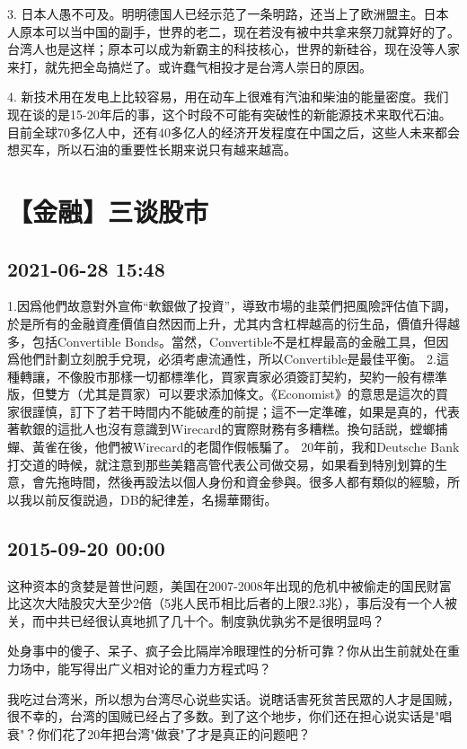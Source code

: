 \documentclass[twocolumn]{ctexart}
\begin{document}
3. 日本人愚不可及。明明德国人已经示范了一条明路，还当上了欧洲盟主。日本人原本可以当中国的副手，世界的老二，现在若没有被中共拿来祭刀就算好的了。台湾人也是这样；原本可以成为新霸主的科技核心，世界的新硅谷，现在没等人家来打，就先把全岛搞烂了。或许蠢气相投才是台湾人崇日的原因。

4. 新技术用在发电上比较容易，用在动车上很难有汽油和柴油的能量密度。我们现在谈的是15-20年后的事，这个时段不可能有突破性的新能源技术来取代石油。目前全球70多亿人中，还有40多亿人的经济开发程度在中国之后，这些人未来都会想买车，所以石油的重要性长期来说只有越来越高。\section*{【金融】三谈股市}
\subsection*{2021-06-28 15:48}

1.因爲他們故意對外宣佈“軟銀做了投資”，導致市場的韭菜們把風險評估值下調，於是所有的金融資產價值自然因而上升，尤其内含杠桿越高的衍生品，價值升得越多，包括Convertible Bonds。當然，Convertible不是杠桿最高的金融工具，但因爲他們計劃立刻脫手兌現，必須考慮流通性，所以Convertible是最佳平衡。
2.這種轉讓，不像股市那樣一切都標準化，買家賣家必須簽訂契約，契約一般有標準版，但雙方（尤其是買家）可以要求添加條文。《Economist》的意思是這次的買家很謹慎，訂下了若干時間内不能破產的前提；這不一定準確，如果是真的，代表著軟銀的這批人也沒有意識到Wirecard的實際財務有多糟糕。換句話説，螳螂捕蟬、黃雀在後，他們被Wirecard的老闆作假帳騙了。
20年前，我和Deutsche Bank打交道的時候，就注意到那些美籍高管代表公司做交易，如果看到特別划算的生意，會先拖時間，然後再設法以個人身份和資金參與。很多人都有類似的經驗，所以我以前反復説過，DB的紀律差，名揚華爾街。
\subsection*{2015-09-20 00:00}
这种资本的贪婪是普世问题，美国在2007-2008年出现的危机中被偷走的国民财富比这次大陆股灾大至少2倍（5兆人民币相比后者的上限2.3兆），事后没有一个人被关，而中共已经很认真地抓了几十个。制度孰优孰劣不是很明显吗？

处身事中的傻子、呆子、疯子会比隔岸冷眼理性的分析可靠？你从出生前就处在重力场中，能写得出广义相对论的重力方程式吗？

我吃过台湾米，所以想为台湾尽心说些实话。说瞎话害死贫苦民眾的人才是国贼，很不幸的，台湾的国贼已经占了多数。到了这个地步，你们还在担心说实话是"唱衰"？你们花了20年把台湾"做衰"了才是真正的问题吧？
\end{document}
